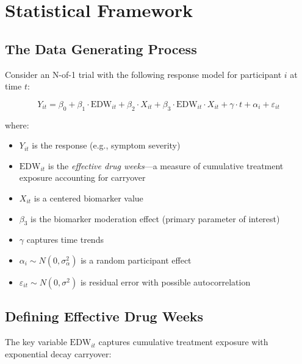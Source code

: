 \documentclass[11pt,letterpaper]{article}
\begin{document}
\section{Statistical Framework}

\subsection{The Data Generating Process}

Consider an N-of-1 trial with the following response model for participant $i$
at time $t$:

\begin{equation}
Y_{it} = \beta_0 + \beta_1 \cdot \text{EDW}_{it} + \beta_2 \cdot X_{it} +
         \beta_3 \cdot \text{EDW}_{it} \cdot X_{it} + \gamma \cdot t +
         \alpha_i + \varepsilon_{it}
\label{eq:model}
\end{equation}

where:
\begin{itemize}
    \item $Y_{it}$ is the response (e.g., symptom severity)
    \item $\text{EDW}_{it}$ is the \emph{effective drug weeks}---a measure of
          cumulative treatment exposure accounting for carryover
    \item $X_{it}$ is a centered biomarker value
    \item $\beta_3$ is the biomarker moderation effect (primary parameter of
          interest)
    \item $\gamma$ captures time trends
    \item $\alpha_i \sim N(0, \sigma^2_\alpha)$ is a random participant effect
    \item $\varepsilon_{it} \sim N(0, \sigma^2)$ is residual error with
          possible autocorrelation
\end{itemize}

\subsection{Defining Effective Drug Weeks}

The key variable $\text{EDW}_{it}$ captures cumulative treatment exposure with
exponential decay carryover:
\end{document}
